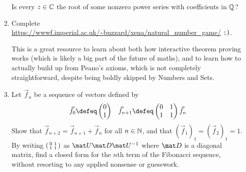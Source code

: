\documentclass[a4paper,12pt]{article}
\begin{document}
\begin{enumerate}[leftmargin=*]
  Is every \(z \in \mathbb C\) the root of some nonzero power series with coefficients
  in \(\mathbb Q\)?
 \item
  Complete \url{https://wwwf.imperial.ac.uk/~buzzard/xena/natural_number_game/}
  \texttt{:)}.

  This is a great resource to learn about both how interactive theorem proving
  works (which is likely a big part of the future of maths), and to learn how
  to actually build up from Peano's axioms, which is not completely
  straightforward, despite being boldly skipped by Numbers and Sets.
 \item
  Let \(\vec f_n\) be a sequence of vectors defined by
  \begin{align*}
   \vec f_0 \defeq
    \begin{pmatrix} 0 \\ 1 \end{pmatrix}
   &&
   \vec f_{n + 1} \defeq
    \begin{pmatrix} 0 & 1 \\ 1 & 1 \end{pmatrix}\vec f_n
  \end{align*}
  Show that
  \(\vec f_{n + 2} = \vec f_{n + 1} + \vec f_n\) for all
  \(n \in \mathbb N\), and that \((\vec f_1)_1 = (\vec f_2)_1 = 1\). By
  writing \(\begin{psmallmatrix} 0 & 1 \\ 1 & 1 \end{psmallmatrix}\) as
  \(\mat U \mat D \mat U^{-1}\) where \(\mat D\) is a diagonal matrix,
  find a closed form for the \(n\)th term of the Fibonacci sequence, without
  resorting to any applied nonsense or guesswork.
\end{enumerate}
\end{document}
